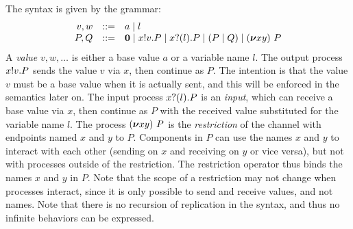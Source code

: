 The syntax is given by the grammar:
\[
\begin{array}{rcl}
  v,w & ::= & a \mid l \\
   P,Q & ::=& \bm{0} \mid x ! v . P \mid x ? (l) . P \mid (P \mid Q) \mid  (\bm{\nu} xy)~P
\end{array}
\]
A \emph{value} \( v, w, \dots \) is either a base value \( a \) or a variable name \( l \).
The output process \( x ! v . P \) sends the value \( v \) via \( x \), then continue as \( P \).
The intention is that the value \( v \) must be a base value when it is actually sent, and this will be enforced in the semantics later on.
The input process \( x ? (l) . P \) is an \emph{input}, which can receive a base value via \( x \), then continue as \( P \) with the received value substituted for the variable name \( l \).
The process \( (\bm{\nu} xy)~P \) is the \emph{restriction} of the channel with endpoints named \( x \) and \( y \) to \( P \).
Components in \( P \) can use the names \( x \) and \( y \) to interact with each other (sending on \( x \) and receiving on \( y \) or vice versa), but not with processes outside of the restriction.
The restriction operator thus binds the names \( x \) and \( y \) in \( P \).
Note that the scope of a restriction may not change when processes interact, since it is only possible to send and receive values, and not names.
Note that there is no recursion of replication in the syntax, and thus no infinite behaviors can be expressed.


